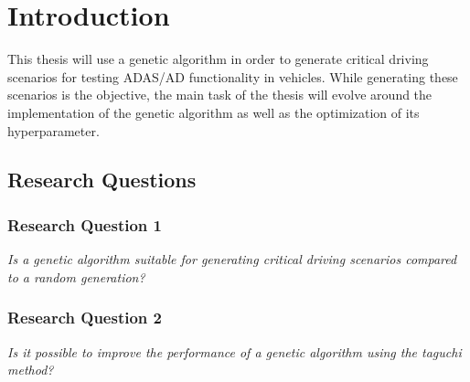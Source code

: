 \chapter{Introduction}
This thesis will use a genetic algorithm in order to generate critical driving scenarios for testing ADAS/AD functionality in vehicles.
While generating these scenarios is the objective, the main task of the thesis will evolve around the implementation of the genetic algorithm as well as the optimization of its hyperparameter.

\section{Research Questions}
\subsection{Research Question 1}
\textit{Is a genetic algorithm suitable for generating critical driving scenarios compared to a random generation?}

\subsection{Research Question 2}
\textit{Is it possible to improve the performance of a genetic algorithm using the taguchi method?}
